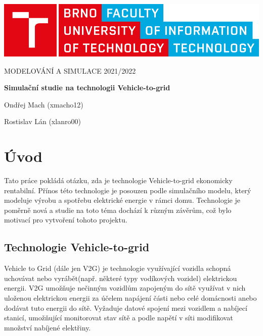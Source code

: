 \documentclass[12pt,a4paper]{article}
\begin{document}
\begin{titlepage}
\begin{center}
\includegraphics[width=0.5\linewidth]{img/logo.pdf}
\vspace{3cm}

\LARGE\uppercase{Modelování a simulace 2021/2022}
\vspace{1cm}

\LARGE\textbf{Simulační studie na technologii Vehicle-to-grid}

\vspace*{\fill}
\large{Ondřej Mach (xmacho12)}

\large{Rostislav Lán (xlanro00)}

\end{center}
\end{titlepage}


\setcounter{page}{1}
\tableofcontents
\clearpage


\section{Úvod}
Tato práce pokládá otázku, zda je technologie Vehicle-to-grid ekonomicky rentabilní.
Přínos této technologie je posouzen podle simulačního modelu, který modeluje výrobu a spotřebu elektrické energie v rámci domu.
Technologie je poměrně nová a studie na toto téma dochází k různým závěrům, což bylo motivací pro vytvoření tohoto projektu.

\subsection{Technologie Vehicle-to-grid}
Vehicle to Grid (dále jen V2G) je technologie využívající vozidla schopná uchovávat nebo vyrábět(např. některé typy vodíkových vozidel) elektrickou energii. 
V2G umožňuje nečinným vozidlům zapojeným do sítě využívat v nich uloženou elektrickou energii za účelem napájení části nebo celé domácnosti anebo dodávat tuto energii do sítě.
Vyžaduje datové spojení mezi vozidlem a nabíjecí stanicí, umožňující monitorovat stav sítě a podle napětí v síti modifikovat množství nabíjené elektřiny.
\end{document}
